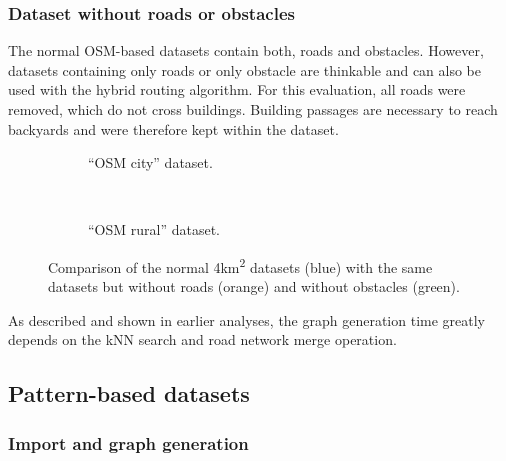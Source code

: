 			
		\subsubsection{Dataset without roads or obstacles}
		
			The normal OSM-based datasets contain both, roads and obstacles.
			However, datasets containing only roads or only obstacle are thinkable and can also be used with the hybrid routing algorithm.
			For this evaluation, all roads were removed, which do not cross buildings.
			Building passages are necessary to reach backyards and were therefore kept within the dataset.
			
			\begin{figure}[h!]
				\begin{subfigure}[t]{\textwidth}
					\begin{figcenter}
						
					\end{figcenter}
					\caption{\enquote{OSM city} dataset.}
					\label{fig:eval-import-osm-no-roads-obstacles-city}
				\end{subfigure}
				\\[3ex]
				\begin{subfigure}[t]{\textwidth}
					\begin{figcenter}
						
					\end{figcenter}
					\caption{\enquote{OSM rural} dataset.}
					\label{fig:eval-import-osm-no-roads-obstacles-rural}
				\end{subfigure}
				\caption{Comparison of the normal 4km\textsuperscript{2} datasets (blue) with the same datasets but without roads (orange) and without obstacles (green).}
				\label{fig:eval-import-osm-rural-no-roads-obstacles}
			\end{figure}
			
			As described and shown in earlier analyses, the graph generation time greatly depends on the kNN search and road network merge operation.
	
	\subsection{Pattern-based datasets}
	
		\subsubsection{Import and graph generation}
		
